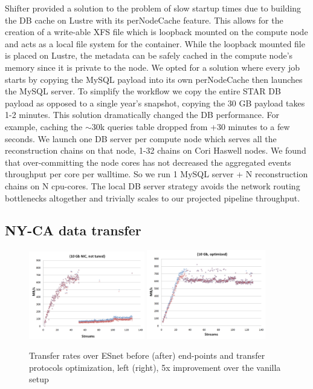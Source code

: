 \documentclass[a4paper]{jpconf}
\begin{document}
Shifter provided a solution to the problem of slow startup times due to
building the DB cache on Lustre with its perNodeCache feature.  This allows
for the creation of a write-able XFS file which is loopback mounted on the compute node
and acts as a local file system for the container.
While the loopback mounted file is placed on Lustre, the metadata can be safely cached in the compute node's memory since it is private to the node.  We opted for a solution where every job starts by copying the MySQL
payload into its own perNodeCache then launches the MySQL server.  To simplify
the workflow we copy the entire STAR DB payload as opposed to a single
year's snapshot, copying the 30 GB payload takes 1-2 minutes. This solution
dramatically changed the DB performance. For example, caching the $\sim$30k
queries table dropped from +30 minutes to a few seconds. We launch one DB
server per compute node which serves all the reconstruction chains on that
node, 1-32 chains on Cori Haswell nodes.  We found that over-committing the node
cores has not decreased the aggregated events throughput per core per walltime.
So we run 1 MySQL server + N reconstruction chains on N cpu-cores. The local DB
server strategy avoids the network routing bottlenecks altogether and trivially
scales to our projected pipeline throughput.

\subsection{NY-CA data transfer}

\begin{figure}[h] 
  \begin{center}
    \includegraphics[width=0.45\textwidth]{network_opt_0}
    \includegraphics[width=0.46\textwidth]{network_opt_1} 
    \caption{\label{network}
    Transfer rates over ESnet before (after) end-points and transfer protocols
    optimization, left (right), 5x improvement over the vanilla setup} 
  \end{center} 
\end{figure}
\end{document}
